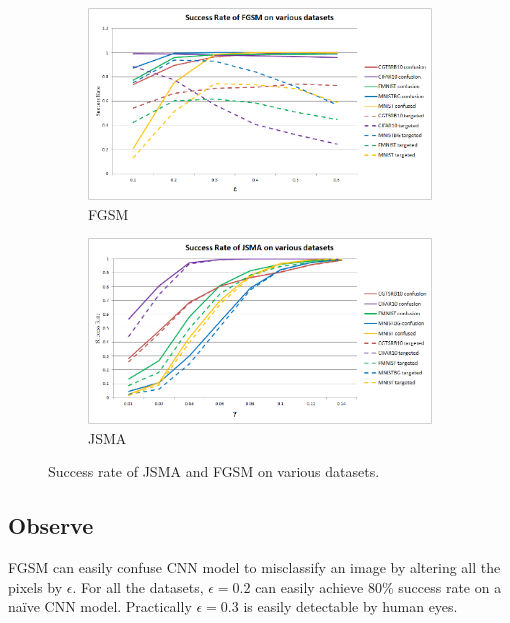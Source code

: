 \documentclass{article}
\begin{document}
\begin{figure}[t!]
    \centering
    \begin{subfigure}[b]{0.49\linewidth}
        \includegraphics[width=\linewidth]{fgsm}
        \caption{FGSM}
        \label{fig:fgsm}
    \end{subfigure}
    \begin{subfigure}[b]{0.49\linewidth}
        \includegraphics[width=\linewidth]{jsma}
        \caption{JSMA}
        \label{fig:jsma}
    \end{subfigure}
    \caption{Success rate of JSMA and FGSM on various datasets.}
\end{figure}


\subsection{Observe}

FGSM can easily confuse CNN model to misclassify an image by altering all the pixels by \(\epsilon\).
For all the datasets, \(\epsilon=0.2\) can easily achieve 80\% success rate on a na\"ive CNN model.
Practically \(\epsilon=0.3\) is easily detectable by human eyes.
\end{document}

